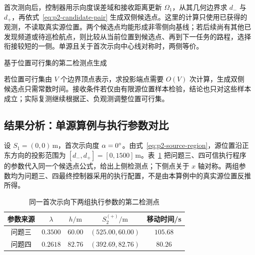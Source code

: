 首次测向后，控制器用示向度误差域和接收距离更新 \(\Omega_1\)，从其几何边界求 \(d_-\) 与 \(d_+\)，再依式~\eqref{eq:p2-candidate-pair} 生成双侧候选点。这里的计算只使用已获得的观测，不读取真实源位置。两个候选点均能形成非零侧向基线；若后续尚有其他已发现频道或待巡检航点，则比较从当前位置到候选点、再到下一任务的路程，选择衔接较短的一侧。单源且关于首次示向中心线对称时，两侧等价。

\begin{modelalgorithm}{基于位置可行集的第二检测点生成}
  \label{alg:p2}
  \begin{enumerate}[leftmargin=2.5em]
  \end{enumerate}
\end{modelalgorithm}

若位置可行集由 \(V\) 个边界顶点表示，求投影端点需要 \(O(V)\) 次计算，生成双侧候选点只需常数时间。接收条件若仅由有限源位置样本检验，结论也只对这些样本成立；实际复测继续根据正、负观测调整位置可行集。

\subsection{结果分析：单源算例与执行参数对比}

设 \(S_1=(0,0)\,\mathrm{m}\)，首次示向度 \(\alpha=0^{\circ}\)。由式~\eqref{eq:p2-source-region}，源位置沿正东方向的投影范围为 \([d_-,d_+]=[0,1500]\,\mathrm{m}\)。表~\ref{tab:p2-unified-example} 把问题三、四可信执行程序的参数代入同一个候选点公式，给出上侧检测点；下侧点关于 \(x\) 轴对称。两组参数均为问题三、四最终控制器采用的执行配置，不是由本算例中的真实源位置反推所得。

\begin{table}[H]
  \centering
  \caption{同一首次示向下两组执行参数的第二检测点}
  \label{tab:p2-unified-example}
  \small
  \begin{tabular}{ccccc}
    \toprule
    参数来源 & \(\lambda\) & \(h/\mathrm{m}\) & \(S_2^{(+)}/\mathrm{m}\) & 移动时间/s \\
    \midrule
    问题三 & \(0.3500\) & \(60.00\) & \((525.00,60.00)\) & \(105.68\) \\
    问题四 & \(0.2618\) & \(82.76\) & \((392.69,82.76)\) & \(80.26\) \\
    \bottomrule
  \end{tabular}
\end{table}

